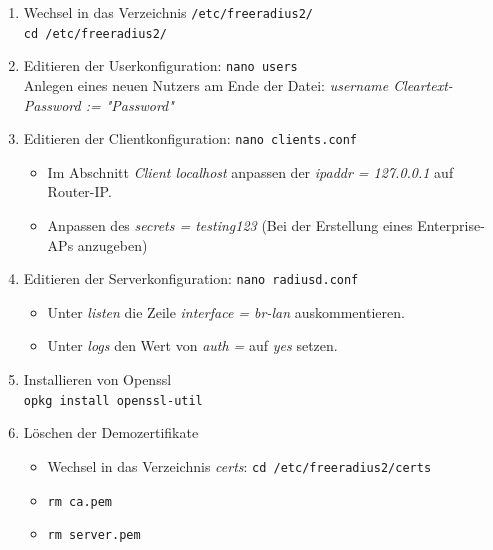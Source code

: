 \begin{enumerate}
	\item {Wechsel in das Verzeichnis \colorbox{altgray}{\lstinline|/etc/freeradius2/|}}\\
	\colorbox{altgray}{\lstinline|cd /etc/freeradius2/|}
	\item {Editieren der Userkonfiguration: \colorbox{altgray}{\lstinline|nano users|}}\\
	Anlegen eines neuen Nutzers am Ende der Datei: \textit{username Cleartext-Password := "Password"}
	\item {Editieren der Clientkonfiguration: \colorbox{altgray}{\lstinline|nano clients.conf|}}
	\begin{itemize}
		\item Im Abschnitt \textit{Client localhost} anpassen der \textit{ipaddr = 127.0.0.1} auf Router-IP.
		\item Anpassen des \textit{secrets = testing123} (Bei der Erstellung eines Enterprise-APs anzugeben)
	\end{itemize}

	\item {Editieren der Serverkonfiguration: \colorbox{altgray}{\lstinline|nano radiusd.conf|}}
	\begin{itemize}
		\item Unter \textit{listen} die Zeile \textit{interface = br-lan} auskommentieren.
		\item Unter \textit{logs} den Wert von  \textit{auth = } auf \textit{yes} setzen.
	\end{itemize}

	\item {Installieren von Openssl} \\
	\colorbox{altgray}{\lstinline|opkg install openssl-util|}
	\item {Löschen der Demozertifikate}
	\begin{itemize}
		\item Wechsel in das Verzeichnis \textit{certs}: \colorbox{altgray}{\lstinline|cd /etc/freeradius2/certs|}
		\item \colorbox{altgray}{\lstinline|rm ca.pem|}
		\item \colorbox{altgray}{\lstinline|rm server.pem|}
	\end{itemize}


\end{enumerate}
